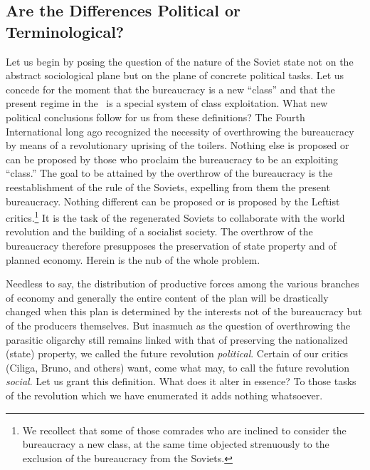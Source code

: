 \subsection*{Are the Differences Political or Terminological?}

Let us begin by posing the question of the nature of the Soviet state not on the abstract sociological plane but on the plane of concrete political tasks. Let us concede for the moment that the bureaucracy is a new “class” and that the present regime in the \USSR\ is a special system of class exploitation. What new political conclusions follow for us from these definitions? The Fourth International long ago recognized the necessity of overthrowing the bureaucracy by means of a revolutionary uprising of the toilers. Nothing else is proposed or can be proposed by those who proclaim the bureaucracy to be an exploiting “class.” The goal to be attained by the overthrow of the bureaucracy is the reestablishment of the rule of the Soviets, expelling from them the present bureaucracy. Nothing different can be proposed or is proposed by the Leftist critics.\footnote{We recollect that some of those comrades who are inclined to consider the bureaucracy a new class, at the same time objected strenuously to the exclusion of the bureaucracy from the Soviets.} It is the task of the regenerated Soviets to collaborate with the world revolution and the building of a socialist society. The overthrow of the bureaucracy therefore presupposes the preservation of state property and of planned economy. Herein is the nub of the whole problem.

Needless to say, the distribution of productive forces among the various branches of economy and generally the entire content of the plan will be drastically changed when this plan is determined by the interests not of the bureaucracy but of the producers themselves. But inasmuch as the question of overthrowing the parasitic oligarchy still remains linked with that of preserving the nationalized (state) property, we called the future revolution \emph{political}. Certain of our critics (Ciliga, Bruno, and others) want, come what may, to call the future revolution \emph{social}. Let us grant this definition. What does it alter in essence? To those tasks of the revolution which we have enumerated it adds nothing whatsoever.

